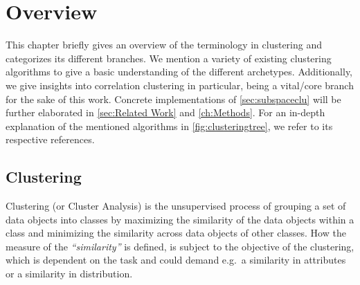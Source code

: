 \chapter{Overview}\label{ch:overview}

This chapter briefly gives an overview of the terminology in clustering and categorizes its different branches. We mention a variety of existing clustering algorithms to give a basic understanding of the different archetypes. Additionally, we give insights into correlation clustering in particular, being a vital/core branch for the sake of this work. Concrete implementations of \autoref{sec:subspaceclu} will be further elaborated in \autoref{sec:Related Work} and \autoref{ch:Methods}. For an in-depth explanation of the mentioned algorithms in \autoref{fig:clusteringtree}, we refer to its respective references.

\section{Clustering}\label{sec:clu}
Clustering (or Cluster Analysis) is the unsupervised process of grouping a set of data objects into classes by maximizing the similarity of the data objects within a class and minimizing the similarity across data objects of other classes. How the measure of the \textit{``similarity''} is defined, is subject to the objective of the clustering, which is dependent on the task and could demand e.g.\ a similarity in attributes or a similarity in distribution. 

